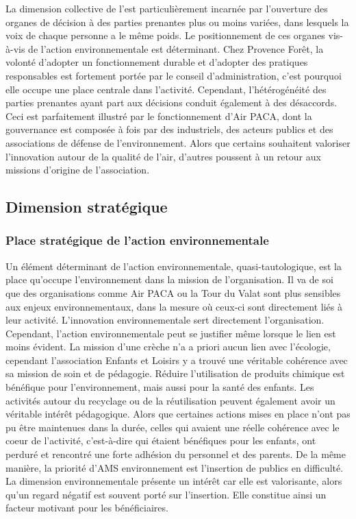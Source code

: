         La dimension collective de l'\ess est particulièrement incarnée par l'ouverture des organes de décision à des parties prenantes plus ou moins variées, dans lesquels la voix de chaque personne a le même poids. Le positionnement de ces organes vis-à-vis de l'action environnementale est déterminant. Chez Provence Forêt, la volonté d'adopter un fonctionnement durable et d'adopter des pratiques responsables est fortement portée par le conseil d'administration, c'est pourquoi elle occupe une place centrale dans l'activité. Cependant, l'hétérogénéité des parties prenantes ayant part aux décisions conduit également à des désaccords. Ceci est parfaitement illustré par le fonctionnement d'Air PACA, dont la gouvernance est composée à fois par des industriels, des acteurs publics et des associations de défense de l'environnement. Alors que certains souhaitent valoriser l'innovation autour de la qualité de l'air, d'autres poussent à un retour aux missions d'origine de l'association.

    \subsection{Dimension stratégique}
        \subsubsection{Place stratégique de l'action environnementale}
        Un élément déterminant de l'action environnementale, quasi-tautologique, est la place qu'occupe l'environnement dans la mission de l'organisation. Il va de soi que des organisations comme Air PACA ou la Tour du Valat sont plus sensibles aux enjeux environnementaux, dans la mesure où ceux-ci sont directement liés à leur activité. L'innovation environnementale sert directement l'organisation.
        Cependant, l'action environnementale peut se justifier même lorsque le lien est moins évident. La mission d'une crèche n'a a priori aucun lien avec l'écologie, cependant l'association Enfants et Loisirs y a trouvé une véritable cohérence avec sa mission de soin et de pédagogie. Réduire l'utilisation de produits chimique est bénéfique pour l'environnement, mais aussi pour la santé des enfants. Les activités autour du recyclage ou de la réutilisation peuvent également avoir un véritable intérêt pédagogique. Alors que certaines actions mises en place n'ont pas pu être maintenues dans la durée, celles qui avaient une réelle cohérence avec le coeur de l'activité, c'est-à-dire qui étaient bénéfiques pour les enfants, ont perduré et rencontré une forte adhésion du personnel et des parents. De la même manière, la priorité d'AMS environnement est l'insertion de publics en difficulté. La dimension environnementale présente un intérêt car elle est valorisante, alors qu'un regard négatif est souvent porté sur l'insertion. Elle constitue ainsi un facteur motivant pour les bénéficiaires.

